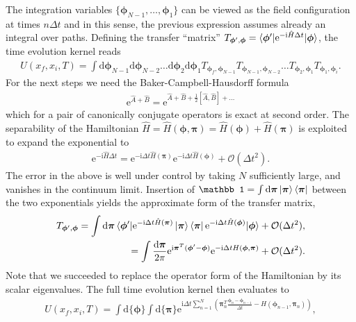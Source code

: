 \documentclass{svmono}
\def\ri{\mathrm i}
\def\re{\mathrm e}
\def\rd{\mathrm d}
\newcommand{\commutator}[1]{\left[ #1 \right]}
\newcommand{\brlr}[1]{\left( #1 \right)}
\begin{document}
The integration variables $\{{\bm\phi}_{N-1},\dots,{\bm\phi}_1\}$ can be viewed as the field configuration at times $n\Delta t$ and in this sense, the previous expression assumes already an integral over paths.
Defining the transfer ``matrix'' $T_{{\bm\phi}',{\bm\phi}}=\braket{{\bm\phi}'|\re^{-\ri\hat H\Delta t}|{\bm\phi}}$, the time evolution kernel reads
\begin{align}
    U(x_f,x_i,T) =
    \int{\rd{\bm\phi}_{N-1}\rd{\bm\phi}_{N-2}\dots\rd{\bm\phi}_2\rd{\bm\phi}_1}
    T_{{\bm\phi}_f,{\bm\phi}_{{N-1}}}
    T_{{\bm\phi}_{{N-1}},{\bm\phi}_{{N-2}}}
    \dots
    T_{{\bm\phi}_{{2}},{\bm\phi}_{{1}}}
    T_{{\bm\phi}_{{1}},{\bm\phi}_i}.
\end{align}
For the next steps we need the Baker-Campbell-Hausdorff formula
\begin{align}
    \re^{\hat A+\hat B} = \re^{\hat A + \hat B + \frac12\commutator{\hat A, \hat B}+\dots}
\end{align}
which for a pair of canonically conjugate operators is exact at second order.
The separability of the Hamiltonian $\hat H = \hat H(\bm\phi,\bm\pi) = \hat H(\bm\phi)+\hat H(\bm\pi)$ is exploited to expand the exponential to
\begin{align}
    \re^{-\ri\hat H\Delta t}
= \re^{-\ri\Delta t\hat H(\bm\pi)}\re^{-\ri\Delta t\hat H(\bm\phi)}+\mathcal O(\Delta t^2).
\end{align}
The error in the above is well under control by taking $N$ sufficiently large, and vanishes in the continuum limit.
Insertion of $\mathbb1=\int\rd\bm\pi\ket{\bm\pi}\bra{\bm\pi}$ between the two exponentials yields the approximate form of the transfer matrix,
\begin{align}
    T_{{\bm\phi}',{\bm\phi}} =
    \int\rd\bm\pi
    \braket{{\bm\phi}'|\re^{-\ri\Delta t\hat H(\bm\pi)}\ket{\bm\pi}\bra{\bm\pi}\re^{-\ri\Delta t\hat H(\bm\phi)}|{\bm\phi}} + \mathcal O(\Delta t^2),
    \\
=
    \int\frac{\rd\bm\pi}{2\pi}\re^{\ri\bm\pi^T(\bm\phi'-\bm\phi)}\re^{-\ri\Delta t H(\bm\phi,\bm\pi)} + \mathcal O(\Delta t^2).
\end{align}
Note that we succeeded to replace the operator form of the Hamiltonian by its scalar eigenvalues.
The full time evolution kernel then evaluates to
\begin{align}
    U(x_f,x_i,T) =
    \int
    {\rd\{\bm\phi\}}\int{\rd\{\bm\pi\}}
    \re^{\ri\Delta t\sum_{n=1}^{N}\brlr{\bm\pi_n^T\frac{\bm\phi_{n}-\bm\phi_{n-1}}{\Delta t}-H(\bm\phi_{n-1},\bm\pi_n)}},
    \label{eq:path_integral_pre_integration}
\end{align}
\end{document}
